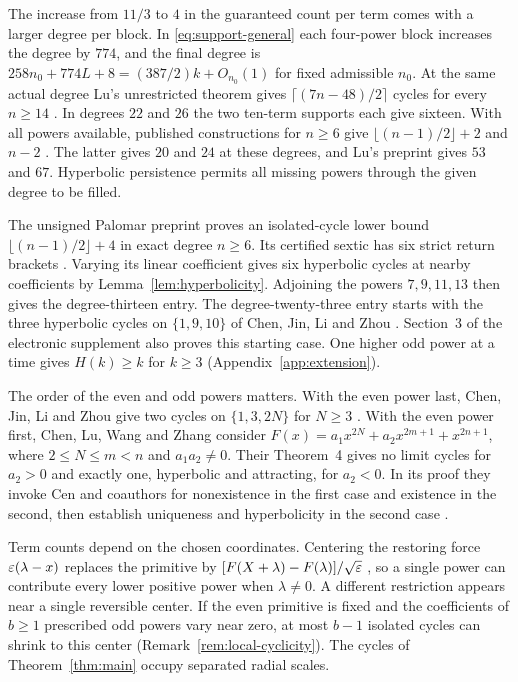 The increase from $11/3$ to $4$ in the guaranteed count per term
comes with a larger degree per block. In \eqref{eq:support-general}
each four-power block increases the degree by $774$, and the final degree is
$258n_0+774L+8=(387/2)k+O_{n_0}(1)$ for fixed admissible $n_0$.
At the same actual degree Lu's unrestricted theorem gives
$\lceil(7n-48)/2\rceil$ cycles for every $n\ge14$
\cite[Theorem~1.1]{LuDegree}. In degrees
$22$ and $26$ the two ten-term supports each give sixteen. With all
powers available, published constructions for $n\ge6$ give
$\lfloor(n-1)/2\rfloor+2$ \cite[Theorem~2]{DMD} and $n-2$
\cite[Theorem~1]{DMH}. The latter gives $20$ and $24$ at these degrees,
and Lu's preprint gives $53$ and $67$.
Hyperbolic persistence permits all missing powers through the given
degree to be filled.

The unsigned Palomar preprint proves an isolated-cycle lower bound
$\lfloor(n-1)/2\rfloor+4$ in exact degree $n\ge6$. Its certified sextic
has six strict return brackets \cite[Theorems~1--2 and Appendix~A]{Palomar}.
Varying its linear coefficient gives six hyperbolic cycles at nearby
coefficients by Lemma~\ref{lem:hyperbolicity}. Adjoining the powers
$7,9,11,13$ then gives the degree-thirteen entry. The degree-twenty-three
entry starts with the three hyperbolic cycles on $\{1,9,10\}$ of
Chen, Jin, Li and Zhou \cite[proof of Theorem~1.2]{CJLZ}.
Section~3 of the electronic supplement also proves this starting case.
One higher odd power at a time gives $H(k)\ge k$ for $k\ge3$
(Appendix~\ref{app:extension}).

The order of the even and odd powers matters. With the even power last,
Chen, Jin, Li and Zhou give two cycles on $\{1,3,2N\}$ for $N\ge3$
\cite[Theorem~1.1 and (2.1)]{CJLZ}. With the even power first,
Chen, Lu, Wang and Zhang consider
$F(x)=a_1x^{2N}+a_2x^{2m+1}+x^{2n+1}$, where $2\le N\le m<n$
and $a_1a_2\ne0$. Their Theorem~4 gives no limit cycles for $a_2>0$
and exactly one, hyperbolic and attracting, for $a_2<0$. In its proof
they invoke Cen and coauthors for nonexistence in the first case and
existence in the second, then establish uniqueness and hyperbolicity
in the second case \cite[Theorem~4 and \S3]{CLWZ}.

Term counts depend on the chosen coordinates. Centering the restoring force $\varepsilon(\lambda-x)$
replaces the primitive by $[F(X+\lambda)-F(\lambda)]/\sqrt{\varepsilon}$
\cite[(5)]{DMH}, so a single power can contribute every lower positive
power when $\lambda\ne0$. A different restriction appears near a
single reversible center. If the even primitive is fixed and the
coefficients of $b\ge1$ prescribed odd powers vary near zero, at most
$b-1$ isolated cycles can shrink to this center (Remark~\ref{rem:local-cyclicity}).
The cycles of Theorem~\ref{thm:main} occupy separated radial scales.

